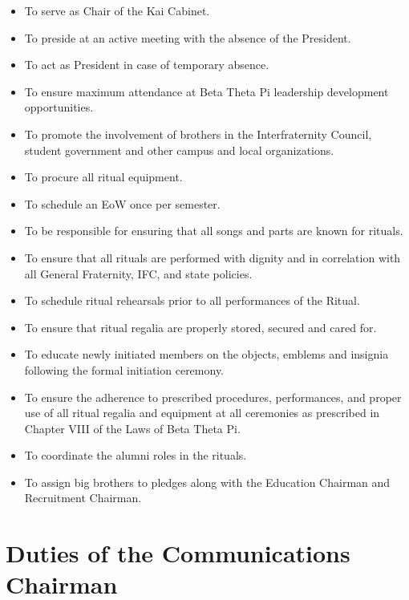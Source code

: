 \begin{itemize}

\item To serve as Chair of the Kai Cabinet.
\item To preside at an active meeting with the absence of the President.
\item To act as President in case of temporary absence.
\item To ensure maximum attendance at Beta Theta Pi leadership development
opportunities.
\item To promote the involvement of brothers in the Interfraternity Council,
student government and other campus and local organizations.
\item To procure all ritual equipment.
\item To schedule an EoW once per semester.
\item To be responsible for ensuring that all songs and parts are known for
rituals.
\item To ensure that all rituals are performed with dignity and in correlation
with all General Fraternity, IFC, and state policies.
\item To schedule ritual rehearsals prior to all performances of the Ritual.
\item To ensure that ritual regalia are properly stored, secured and cared for.
\item To educate newly initiated members on the objects, emblems and insignia
following the formal initiation ceremony.
\item To ensure the adherence to prescribed procedures, performances, and
proper use of all ritual regalia and equipment at all ceremonies as prescribed
in Chapter VIII of the Laws of Beta Theta Pi.
\item To coordinate the alumni roles in the rituals.
\item To assign big brothers to pledges along with the Education Chairman and
Recruitment Chairman.
\end{itemize}

\section{Duties of the Communications Chairman}
\label{sec:duties-of-the-communications-chairman}

